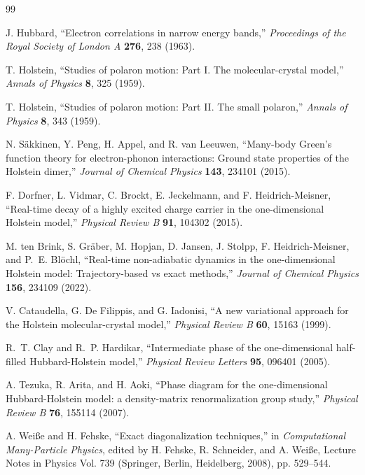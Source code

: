 \documentclass[
  reprint,
  amsmath,
  amssymb,
  aps,
  pra,
  nofootinbib,
  superscriptaddress,
  floatfix
]{revtex4-2}
\begin{document}
\begin{thebibliography}{99}

J. Hubbard,
``Electron correlations in narrow energy bands,''
\emph{Proceedings of the Royal Society of London A} \textbf{276}, 238 (1963).

T. Holstein,
``Studies of polaron motion: Part I. The molecular-crystal model,''
\emph{Annals of Physics} \textbf{8}, 325 (1959).

T. Holstein,
``Studies of polaron motion: Part II. The small polaron,''
\emph{Annals of Physics} \textbf{8}, 343 (1959).

N. S\"akkinen, Y. Peng, H. Appel, and R. van Leeuwen,
``Many-body Green's function theory for electron-phonon interactions: Ground state properties of the Holstein dimer,''
\emph{Journal of Chemical Physics} \textbf{143}, 234101 (2015).

F. Dorfner, L. Vidmar, C. Brockt, E. Jeckelmann, and F. Heidrich-Meisner,
``Real-time decay of a highly excited charge carrier in the one-dimensional Holstein model,''
\emph{Physical Review B} \textbf{91}, 104302 (2015).

M. ten Brink, S. Gr\"aber, M. Hopjan, D. Jansen, J. Stolpp, F. Heidrich-Meisner, and P.~E. Bl\"ochl,
``Real-time non-adiabatic dynamics in the one-dimensional Holstein model: Trajectory-based vs exact methods,''
\emph{Journal of Chemical Physics} \textbf{156}, 234109 (2022).

V. Cataudella, G. De Filippis, and G. Iadonisi,
``A new variational approach for the Holstein molecular-crystal model,''
\emph{Physical Review B} \textbf{60}, 15163 (1999).

R.~T. Clay and R.~P. Hardikar,
``Intermediate phase of the one-dimensional half-filled Hubbard-Holstein model,''
\emph{Physical Review Letters} \textbf{95}, 096401 (2005).

A. Tezuka, R. Arita, and H. Aoki,
``Phase diagram for the one-dimensional Hubbard-Holstein model: a density-matrix renormalization group study,''
\emph{Physical Review B} \textbf{76}, 155114 (2007).

A. Wei{\ss}e and H. Fehske,
``Exact diagonalization techniques,''
in \emph{Computational Many-Particle Physics},
edited by H. Fehske, R. Schneider, and A. Wei{\ss}e,
Lecture Notes in Physics Vol. 739 (Springer, Berlin, Heidelberg, 2008), pp. 529--544.


\end{thebibliography}
\end{document}
